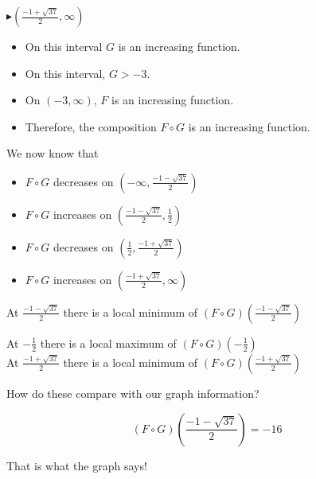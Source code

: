 \documentclass{ximera}
\begin{document}
\begin{example}
\textbf{\textcolor{blue!55!black}{$\blacktriangleright (\frac{-1 + \sqrt{37}}{2}, \infty)$}}


\begin{itemize}
\item On this interval $G$ is an increasing function.
\item On this interval, $G > -3$.
\item On $(-3, \infty)$, $F$ is an increasing function.
\item Therefore, the composition $F \circ G$ is an increasing function.
\end{itemize}





We now know that 

\begin{itemize}
\item $F \circ G$ decreases on $(-\infty, \frac{-1 - \sqrt{37}}{2})$ \\
\item $F \circ G$ increases on $(\frac{-1 - \sqrt{37}}{2}, \frac{1}{2})$ \\
\item $F \circ G$ decreases on $(\frac{1}{2}, \frac{-1 + \sqrt{37}}{2})$ \\
\item $F \circ G$ increases on $(\frac{-1 + \sqrt{37}}{2}, \infty)$
\end{itemize}




At $\frac{-1 - \sqrt{37}}{2}$ there is a local minimum of $(F \circ G)\left( \frac{-1 - \sqrt{37}}{2} \right)$ 


At $-\frac{1}{2}$ there is a local maximum of $(F \circ G)\left( -\frac{1}{2} \right)$ \\


At $\frac{-1 + \sqrt{37}}{2}$ there is a local minimum of $(F \circ G)\left( \frac{-1 + \sqrt{37}}{2} \right)$ 




\end{example}



How do these compare with our graph information? 




\[
(F \circ G)\left( \frac{-1 - \sqrt{37}}{2} \right) = -16
\]

That is what the graph says! 
\end{document}
